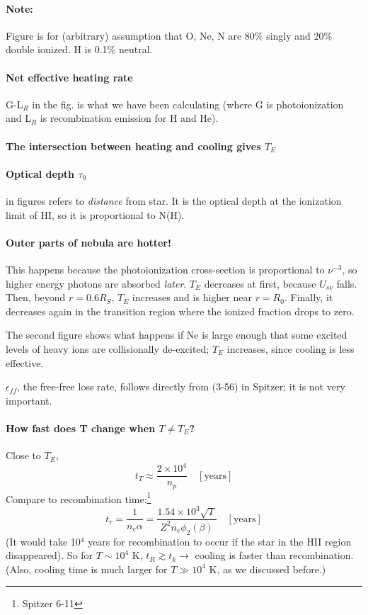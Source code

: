 \documentclass[12pt]{article}
\newcommand{\mar}[1]{\hspace{0pt}\marginpar{-\textcolor{black}{#1}-}}
\newcommand{\mynotes}[1]{\textcolor{mygreen}{#1}}
\begin{document}
\paragraph{Note:}
Figure is for (arbitrary) assumption that O, Ne, N are 80\% singly and
20\% double ionized. H is 0.1\% neutral.
\paragraph{Net effective heating rate}
G-L$_{R}$ in the fig. is what we have been calculating
(where G is photoionization and L$_{R}$ is recombination emission for
H and He).

\paragraph{The intersection between heating and cooling gives $T_{E}$}

\paragraph{Optical depth $\tau_{0}$} in figures refers to \emph{distance}
from star. It is the optical depth at the ionization limit of HI, so
it is proportional to N(H).

\paragraph{Outer parts of nebula are hotter!}
\mar{158}This happens because the photoionization cross-section is
proportional to $\nu^{-3}$, so higher energy photons are absorbed
\emph{later}. $T_{E}$ decreases at first, because $U_{s\nu}$ falls.
Then, beyond $r = 0.6R_{S}$, $T_{E}$ increases and is higher near
$r = R_{0}$. Finally, it decreases again in the transition region
where the ionized fraction drops to zero.

The second figure shows what happens if Ne is large enough that some
excited levels of heavy ions are collisionally de-excited;
$T_{E}$ increases, since cooling is less effective.

$\epsilon_{ff}$, the free-free loss rate, follows directly from
(3-56) in Spitzer; it is not very important.

\paragraph{How fast does T change when $T \neq T_{E}$?}
Close to $T_{E}$,
\[
    t_{T} \approx \frac{2\times10^{4}}{n_{p}} \quad [\mathrm{years}]
    \]
Compare to recombination time:\footnote{Spitzer 6-11}
\[
    t_{r} = \frac{1}{n_{e}\alpha}
    = \frac{1.54\times10^{3}\sqrt{T}}{Z^{2}n_{e}\phi_{2}(\beta)}
    \quad [\mathrm{years}]
    \]
\mynotes{(It would take 10$^{4}$ years for recombination to occur if
the star in the HII region disappeared).}
So for $T \sim 10^{4}$ K, $t_{R} \gtrsim t_{k} \rightarrow$
cooling is faster than recombination. (Also, cooling time is much larger
for $T \gg 10^{4}$ K, as we discussed before.)
\end{document}
